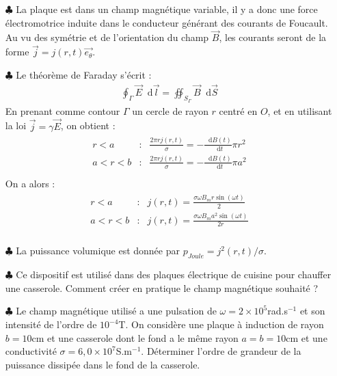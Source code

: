 \documentclass{report}
\newcommand*\dif{\mathop{}\!\mathrm{d}}
\begin{document}
\begin{itemize}

	\item[$\clubsuit$] La plaque est dans un champ magnétique variable, il y a donc une force électromotrice induite dans le conducteur générant des courants de Foucault. Au vu des symétrie et de l'orientation du champ $\vec{B}$, les courants seront de la forme $\vec{j}=j(r,t)\vec{e_\theta}$.
	
	\item[$\clubsuit$] Le théorème de Faraday s'écrit :
	\begin{align*}
		\oint_\Gamma\vec{E}\dif\vec{l}=\oiint_{S_\Gamma}\vec{B}\dif\vec{S}
	\end{align*}
	En prenant comme contour $\Gamma$ un cercle de rayon $r$ centré en $O$, et en utilisant la loi $\vec{j}=\gamma\vec{E}$, on obtient :
	\begin{align*}
	\begin{array}{ccc}
	r<a & : & \frac{2\pi rj(r,t)}{\sigma}=-\frac{\dif B(t)}{\dif t}\pi r^2\\
	a<r<b & : & \frac{2\pi rj(r,t)}{\sigma}=-\frac{\dif B(t)}{\dif t}\pi a^2\\
	\end{array}
	\end{align*}		
On a alors :
	\begin{align*}
	\begin{array}{ccc}
	r<a & : & j(r,t)=\frac{\sigma\omega B_m r\sin(\omega t)}{2}\\
	a<r<b & : &  j(r,t)=\frac{\sigma\omega B_m a^2\sin(\omega t)}{2r}\\
	\end{array}
	\end{align*}		
		
	\item[$\clubsuit$] La puissance volumique est donnée par $p_{Joule}= j^2(r,t)/\sigma$.
	
	
	\item[$\clubsuit$] Ce dispositif est utilisé dans des plaques électrique de cuisine pour chauffer une casserole. Comment créer en pratique le champ magnétique souhaité ?
	
	\item[$\clubsuit$] Le champ magnétique utilisé a une pulsation de $\omega=2\times10^{5}$rad.s$^{-1}$ et son intensité de l'ordre de $10^{-4}$T. On considère une plaque à induction de rayon $b=10$cm et une casserole dont le fond a le même rayon $a=b=10$cm et une conductivité $\sigma=6,0\times10^{7}$S.m$^{-1}$. Déterminer l'ordre de grandeur de la puissance dissipée dans le fond de la casserole. 

\end{itemize}
\end{document}
